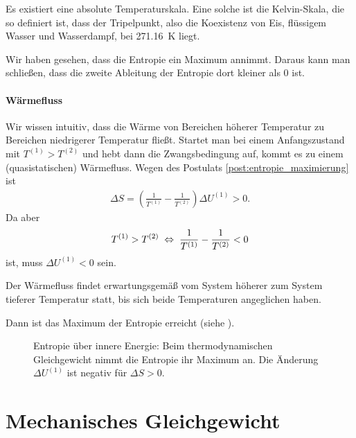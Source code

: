 \begin{formal}
    Es existiert eine absolute Temperaturskala. Eine solche ist die Kelvin-Skala, die so definiert ist, dass der Tripelpunkt, also die Koexistenz von Eis, flüssigem Wasser und Wasserdampf, bei \qty{271,16}{\kelvin} liegt.
\end{formal}

Wir haben gesehen, dass die Entropie ein Maximum annimmt. Daraus kann man schließen, dass die zweite Ableitung der Entropie dort kleiner als $0$ ist.

\paragraph*{Wärmefluss}

Wir wissen intuitiv, dass die Wärme von Bereichen höherer Temperatur zu Bereichen niedrigerer Temperatur fließt. Startet man bei einem Anfangszustand mit $T^{(1)}> T^{(2)}$ und hebt dann die Zwangsbedingung auf, kommt es zu einem (quasistatischen) Wärmefluss.
Wegen des Postulats \ref{post:entropie_maximierung} ist
\begin{align*}
    \Delta S= \left(\frac{1}{T^{(1)}}-\frac{1}{T^{(2)}}\right)\Delta U^{(1)} > 0.
\end{align*}
Da aber
\begin{align*}
    T^{(1)}> T^{(2)} \;\Leftrightarrow\; \frac{1}{T^{(1)}}-\frac{1}{T^{(2)}} < 0
\end{align*}
ist, muss $\Delta U^{(1)} <0$ sein.
\begin{formal}
    Der Wärmefluss findet erwartungsgemäß vom System höherer zum System tieferer Temperatur statt, bis sich beide Temperaturen angeglichen haben.
\end{formal}
Dann ist das Maximum der Entropie erreicht (siehe ).

\begin{figure}[htbp]
    \centering
    \tfigFunktionEntropieMaximum
    \caption{Entropie über innere Energie: Beim thermodynamischen Gleichgewicht nimmt die Entropie ihr Maximum an. Die Änderung $\Delta U^{(1)}$ ist negativ für $\Delta S>0$. }
    \label{fig:FunktionEntropieMaximum}
\end{figure}




\section{Mechanisches Gleichgewicht}


